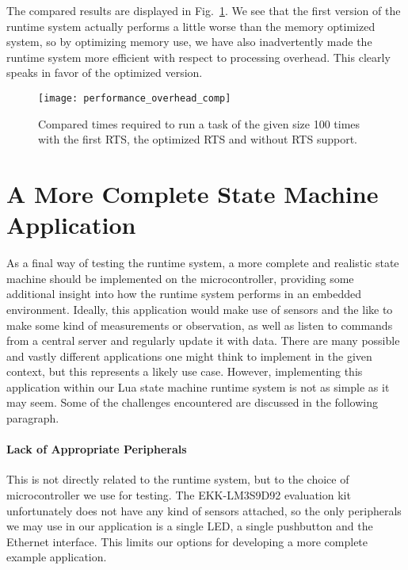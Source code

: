 \noindent
The compared results are displayed in Fig.~\ref{fig:performance_overhead_comp}. We see that the first version of the runtime system actually performs a little worse than the memory optimized system, so by optimizing memory use, we have also inadvertently made the runtime system more efficient with respect to processing overhead. This clearly speaks in favor of the optimized version.

\begin{figure}[htp]
	\centering
	\texttt{[image: performance\_overhead\_comp]}
	\caption[Results of performance comparison with the first version of the RTS]{Compared times required to run a task of the given size 100 times with the first RTS, the optimized RTS and without RTS support.}
	\label{fig:performance_overhead_comp}
\end{figure}

\FloatBarrier
\section{A More Complete State Machine Application}
\label{sec:complete_app}
As a final way of testing the runtime system, a more complete and realistic state machine should be implemented on the microcontroller, providing some additional insight into how the runtime system performs in an embedded environment. Ideally, this application would make use of sensors and the like to make some kind of measurements or observation, as well as listen to commands from a central server and regularly update it with data. There are many possible and vastly different applications one might think to implement in the given context, but this represents a likely use case. However, implementing this application within our Lua state machine runtime system is not as simple as it may seem. Some of the challenges encountered are discussed in the following paragraph.

\paragraph{Lack of Appropriate Peripherals} This is not directly related to the runtime system, but to the choice of microcontroller we use for testing. The EKK-LM3S9D92 evaluation kit unfortunately does not have any kind of sensors attached, so the only peripherals we may use in our application is a single LED, a single pushbutton and the Ethernet interface. This limits our options for developing a more complete example application.

